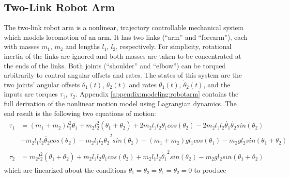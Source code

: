 \subsection{Two-Link Robot Arm}
The two-link robot arm is a nonlinear, trajectory controllable mechanical system which models locomotion of an arm.  It has two links (``arm'' and ``forearm''), each with masses $m_{1}$, $m_{2}$ and lengths $l_{1}$, $l_{2}$, respectively.  For simplicity, rotational inertia of the links are ignored and both masses are taken to be concentrated at the ends of the links.  Both joints (``shoulder'' and ``elbow'') can be torqued arbitrarily to control angular offsets and rates.  The states of this system are the two joints' angular offsets $\theta_{1}(t)$, $\theta_{2}(t)$ and rates $\dot{\theta}_{1}(t)$, $\dot{\theta}_{2}(t)$, and the inputs are torques $\tau_{1}$, $\tau_{2}$.  Appendix \ref{appendix:modeling:robotarm} contains the full derivation of the nonlinear motion model using Lagrangian dynamics.  The end result is the following two equations of motion:
\begin{subequations}
\begin{align}
\begin{split}
	\tau_{1} &= (m_{1} + m_{2})l_{1}^{2}\ddot{\theta_{1}} +
	m_{2}l_{2}^{2}(\ddot{\theta_{1}} + \ddot{\theta_{2}})
	+ 2m_{2}l_{1}l_{2}\ddot{\theta_{1}}cos(\theta_{2})
	- 2m_{2}l_{1}l_{2}\dot{\theta_{1}}\dot{\theta_{2}}sin(\theta_{2})\\
	&+ m_{2}l_{1}l_{2}\ddot{\theta_{2}}cos(\theta_{2})
	- m_{2}l_{1}l_{2}\dot{\theta_{2}}^{2}sin(\theta_{2})
	- (m_{1} + m_{2})gl_{1}cos(\theta_{1}) - m_{2}gl_{2}sin(\theta_{1} + \theta_{2})
\end{split}
	\\
\begin{split}
	\tau_{2} &= m_{2}l_{2}^{2}(\ddot{\theta_{1}} + \ddot{\theta_{2}})
	+ m_{2}l_{1}l_{2}\ddot{\theta_{1}}cos(\theta_{2})
	+ m_{2}l_{1}l_{2}\dot{\theta_{1}}^{2}sin(\theta_{2})
	- m_{2}gl_{2}sin(\theta_{1} + \theta_{2})
\end{split}
\end{align}
\end{subequations}
which are linearized about the conditions $\theta_{1} = \theta_{2} = \dot{\theta}_{1} = \dot{\theta}_{2} = 0$ to produce
